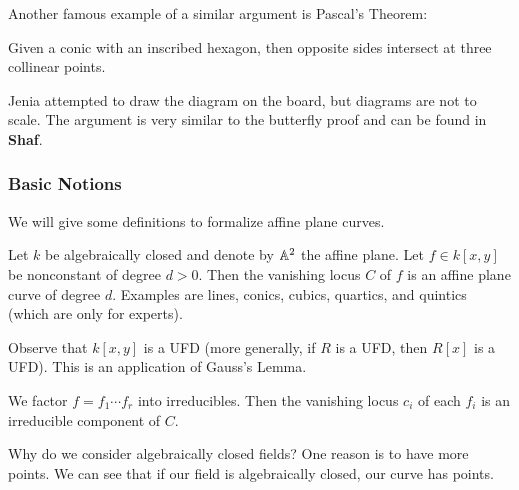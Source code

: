 \documentclass[twoside, 10pt]{article}
\newcommand{\shaf}{\textbf{Shaf}}
\begin{document}
    Another famous example of a similar argument is Pascal's Theorem:

    \begin{thm}[Pascal] Given a conic with an inscribed hexagon, then opposite
    sides intersect at three collinear points.  \end{thm}

    Jenia attempted to draw the diagram on the board, but diagrams are not to
    scale. The argument is very similar to the butterfly proof and can be found
    in \shaf.

    \subsubsection{Basic Notions}

    We will give some definitions to formalize affine plane curves.
    
    \begin{defn} Let $k$ be algebraically closed and denote
        by $\mathbb{A}^2$ the affine plane.  Let $f \in k[x,y]$ be nonconstant of
        degree $d>0$. Then the vanishing locus $C$ of $f$ is an affine plane
        curve of degree $d$. Examples are lines, conics, cubics, quartics, and
    quintics (which are only for experts).  \end{defn}

    \begin{rmk} Observe that $k[x,y]$ is a UFD (more generally, if $R$ is a
    UFD, then $R[x]$ is a UFD). This is an application of Gauss's Lemma.
\end{rmk}

    \begin{defn} We factor $f = f_1 \cdots f_r$ into
    irreducibles. Then the vanishing locus $c_i$ of each $f_i$ is an
irreducible component of $C$.  \end{defn}
    
    Why do we consider algebraically closed fields? One reason is to have more
    points. We can see that if our field is algebraically closed, our curve has
    points.
\end{document}
